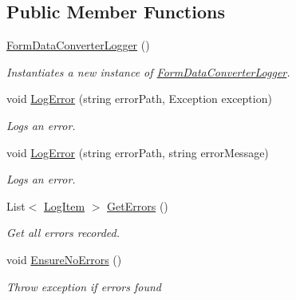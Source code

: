 \subsection*{Public Member Functions}
\begin{DoxyCompactItemize}
\item 
\hyperlink{classCqrs_1_1WebApi_1_1Formatters_1_1FormMultipart_1_1Infrastructure_1_1Logger_1_1FormDataConverterLogger_a232c53d2c78cab6b419a37306d64c74b_a232c53d2c78cab6b419a37306d64c74b}{Form\+Data\+Converter\+Logger} ()
\begin{DoxyCompactList}\small\item\em Instantiates a new instance of \hyperlink{classCqrs_1_1WebApi_1_1Formatters_1_1FormMultipart_1_1Infrastructure_1_1Logger_1_1FormDataConverterLogger}{Form\+Data\+Converter\+Logger}. \end{DoxyCompactList}\item 
void \hyperlink{classCqrs_1_1WebApi_1_1Formatters_1_1FormMultipart_1_1Infrastructure_1_1Logger_1_1FormDataConverterLogger_ab54b4f24cc7ee7eacddbb9900a832ca3_ab54b4f24cc7ee7eacddbb9900a832ca3}{Log\+Error} (string error\+Path, Exception exception)
\begin{DoxyCompactList}\small\item\em Logs an error. \end{DoxyCompactList}\item 
void \hyperlink{classCqrs_1_1WebApi_1_1Formatters_1_1FormMultipart_1_1Infrastructure_1_1Logger_1_1FormDataConverterLogger_a72fcac7560a05dfebbff772a4216a5d8_a72fcac7560a05dfebbff772a4216a5d8}{Log\+Error} (string error\+Path, string error\+Message)
\begin{DoxyCompactList}\small\item\em Logs an error. \end{DoxyCompactList}\item 
List$<$ \hyperlink{classCqrs_1_1WebApi_1_1Formatters_1_1FormMultipart_1_1Infrastructure_1_1Logger_1_1FormDataConverterLogger_1_1LogItem}{Log\+Item} $>$ \hyperlink{classCqrs_1_1WebApi_1_1Formatters_1_1FormMultipart_1_1Infrastructure_1_1Logger_1_1FormDataConverterLogger_a5cdd85325e839d1238b0384fba15f595_a5cdd85325e839d1238b0384fba15f595}{Get\+Errors} ()
\begin{DoxyCompactList}\small\item\em Get all errors recorded. \end{DoxyCompactList}\item 
void \hyperlink{classCqrs_1_1WebApi_1_1Formatters_1_1FormMultipart_1_1Infrastructure_1_1Logger_1_1FormDataConverterLogger_a8e3cd3f8d5e7b3d2b24b67b2ce3e69df_a8e3cd3f8d5e7b3d2b24b67b2ce3e69df}{Ensure\+No\+Errors} ()
\begin{DoxyCompactList}\small\item\em Throw exception if errors found \end{DoxyCompactList}\end{DoxyCompactItemize}


